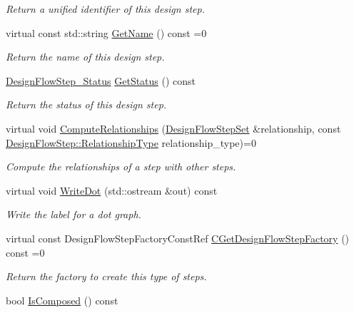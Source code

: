 \begin{DoxyCompactItemize}
\begin{DoxyCompactList}\small\item\em Return a unified identifier of this design step. \end{DoxyCompactList}\item 
virtual const std\+::string \hyperlink{classDesignFlowStep_a01e5ebfab88db3b3b7f832f80075fad8}{Get\+Name} () const =0
\begin{DoxyCompactList}\small\item\em Return the name of this design step. \end{DoxyCompactList}\item 
\hyperlink{design__flow__step_8hpp_afb1f0d73069c26076b8d31dbc8ebecdf}{Design\+Flow\+Step\+\_\+\+Status} \hyperlink{classDesignFlowStep_a489f53821a358e1d67dd0cfc042bd496}{Get\+Status} () const
\begin{DoxyCompactList}\small\item\em Return the status of this design step. \end{DoxyCompactList}\item 
virtual void \hyperlink{classDesignFlowStep_a65bf7bcb603189a7ddcf930c3a9fd7fe}{Compute\+Relationships} (\hyperlink{classDesignFlowStepSet}{Design\+Flow\+Step\+Set} \&relationship, const \hyperlink{classDesignFlowStep_a723a3baf19ff2ceb77bc13e099d0b1b7}{Design\+Flow\+Step\+::\+Relationship\+Type} relationship\+\_\+type)=0
\begin{DoxyCompactList}\small\item\em Compute the relationships of a step with other steps. \end{DoxyCompactList}\item 
virtual void \hyperlink{classDesignFlowStep_a1562bb503d9b9f2a2a059041d79043c6}{Write\+Dot} (std\+::ostream \&out) const
\begin{DoxyCompactList}\small\item\em Write the label for a dot graph. \end{DoxyCompactList}\item 
virtual const Design\+Flow\+Step\+Factory\+Const\+Ref \hyperlink{classDesignFlowStep_a5510a8d296670a07f6b53312c448994c}{C\+Get\+Design\+Flow\+Step\+Factory} () const =0
\begin{DoxyCompactList}\small\item\em Return the factory to create this type of steps. \end{DoxyCompactList}\item 
bool \hyperlink{classDesignFlowStep_a4aa24c5bf7334ad80130ace3f6d5d7d6}{Is\+Composed} () const

\end{DoxyCompactItemize}
